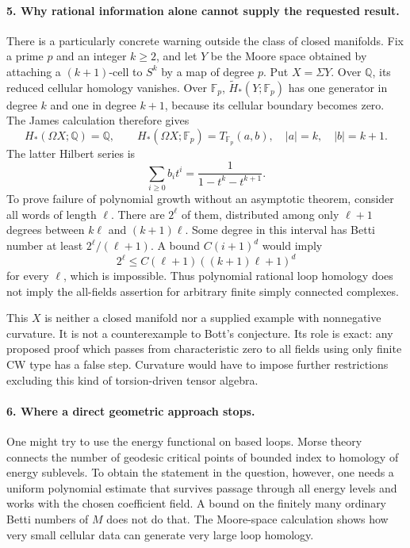 \documentclass[11pt]{article}
\begin{document}
\paragraph{5. Why rational information alone cannot supply the requested result.}
There is a particularly concrete warning outside the class of closed manifolds. Fix a prime $p$ and an integer $k\geq2$, and let $Y$ be the Moore space obtained by attaching a $(k+1)$-cell to $S^k$ by a map of degree $p$. Put $X=\Sigma Y$. Over $\mathbb Q$, its reduced cellular homology vanishes. Over $\mathbb F_p$, $\widetilde H_*(Y;\mathbb F_p)$ has one generator in degree $k$ and one in degree $k+1$, because its cellular boundary becomes zero. The James calculation therefore gives
\[
 H_*(\Omega X;\mathbb Q)=\mathbb Q,
 \qquad
 H_*(\Omega X;\mathbb F_p)=T_{\mathbb F_p}(a,b),
 \quad |a|=k,\quad |b|=k+1.
\]
The latter Hilbert series is
\[
 \sum_{i\geq0}b_i t^i=\frac1{1-t^k-t^{k+1}}.
\]
To prove failure of polynomial growth without an asymptotic theorem, consider all words of length $\ell$. There are $2^\ell$ of them, distributed among only $\ell+1$ degrees between $k\ell$ and $(k+1)\ell$. Some degree in this interval has Betti number at least $2^\ell/(\ell+1)$. A bound $C(i+1)^d$ would imply
\[
 2^\ell\leq C(\ell+1)((k+1)\ell+1)^d
\]
for every $\ell$, which is impossible. Thus polynomial rational loop homology does not imply the all-fields assertion for arbitrary finite simply connected complexes.

This $X$ is neither a closed manifold nor a supplied example with nonnegative curvature. It is not a counterexample to Bott's conjecture. Its role is exact: any proposed proof which passes from characteristic zero to all fields using only finite CW type has a false step. Curvature would have to impose further restrictions excluding this kind of torsion-driven tensor algebra.

\paragraph{6. Where a direct geometric approach stops.}
One might try to use the energy functional on based loops. Morse theory connects the number of geodesic critical points of bounded index to homology of energy sublevels. To obtain the statement in the question, however, one needs a uniform polynomial estimate that survives passage through all energy levels and works with the chosen coefficient field. A bound on the finitely many ordinary Betti numbers of $M$ does not do that. The Moore-space calculation shows how very small cellular data can generate very large loop homology.
\end{document}
